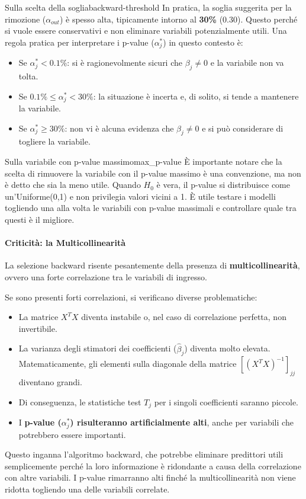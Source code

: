 \begin{nota}{Sulla scelta della soglia}{backward-threshold}
In pratica, la soglia suggerita per la rimozione (\(\alpha_{out}\)) è spesso
alta, tipicamente intorno al \textbf{30\%} (\(0.30\)). Questo perché si vuole
essere conservativi e non eliminare variabili potenzialmente utili. Una regola
pratica per interpretare i p-value (\(\alpha_j^*\)) in questo contesto è:
\begin{itemize}
    \item Se \(\alpha_j^* < 0.1\%\): si è ragionevolmente sicuri che \(\beta_j
    \neq 0\) e la variabile non va tolta.
    \item Se \(0.1\% \leq \alpha_j^* < 30\%\): la situazione è incerta e, di
    solito, si tende a mantenere la variabile.
    \item Se \(\alpha_j^* \geq 30\%\): non vi è alcuna evidenza che \(\beta_j
    \neq 0\) e si può considerare di togliere la variabile.
\end{itemize}
\end{nota}

\begin{nota}{Sulla variabile con p-value massimo}{max_p-value}
È importante notare che la scelta di rimuovere la variabile con il p-value
massimo è una convenzione, ma non è detto che sia la meno utile. Quando
\(H_0\) è vera, il p-value si distribuisce come un'Uniforme(0,1) e non
privilegia valori vicini a 1. È utile testare i modelli togliendo una alla
volta le variabili con p-value massimali e controllare quale tra questi è il
migliore.
\end{nota}

\paragraph{Criticità: la Multicollinearità}
La selezione backward risente pesantemente della presenza di
\textbf{multicollinearità}, ovvero una forte correlazione tra le variabili di
ingresso.

Se sono presenti forti correlazioni, si verificano diverse problematiche:
\begin{itemize}
    \item La matrice \(X^T X\) diventa instabile o, nel caso di correlazione
    perfetta, non invertibile.
    \item La varianza degli stimatori dei coefficienti (\(\hat{\beta}_j\))
    diventa molto elevata. Matematicamente, gli elementi sulla diagonale della
    matrice \([(X^T X)^{-1}]_{jj}\) diventano grandi.
    \item Di conseguenza, le statistiche test \(T_j\) per i singoli coefficienti
    saranno piccole.
    \item I \textbf{p-value (\(\alpha_j^*\)) risulteranno artificialmente alti},
    anche per variabili che potrebbero essere importanti.
\end{itemize}
Questo inganna l'algoritmo backward, che potrebbe eliminare predittori utili
semplicemente perché la loro informazione è ridondante a causa della
correlazione con altre variabili. I p-value rimarranno alti finché la
multicollinearità non viene ridotta togliendo una delle variabili correlate.

